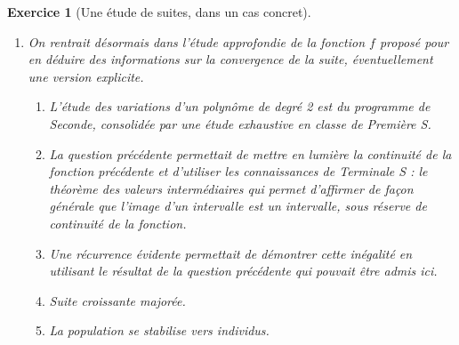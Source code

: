 \documentclass[12pt,a4paper]{article}
\newcommand{\np}{\numprint}
\theoremstyle{break}
\theoremstyle{nobreak}
\newtheorem{exercice}{Exercice}
\theoremstyle{nonumberplain}
\begin{document}
\begin{exercice}[Une étude de suites, dans un cas concret]
\begin{enumerate}
\begin{enumerate}
             Il suffisait d'effectuer un calcul ou de mettre en œuvre
             rapidement l'algorithme sur la calculatrice.
           \item On cherchait juste à établir une conjecture sensée à
             partir du tableau de valeurs précédent. Quelques élèves ont
             fournit des résultats étranges.
         \end{enumerate}
       \item On rentrait désormais dans l'étude approfondie de la
         fonction $f$ proposé pour en déduire des informations sur la
         convergence de la suite, éventuellement une version explicite.
         \begin{enumerate}
           \item L'étude des variations d'un polynôme de degré 2 est du
             programme de Seconde, consolidée par une étude exhaustive
             en classe de Première S.
           \item La question précédente permettait de mettre en lumière
             la continuité de la fonction précédente et d'utiliser les
             connaissances de Terminale S : le théorème des valeurs
             intermédiaires qui permet d'affirmer de façon générale que
             l'image d'un intervalle est un intervalle, sous réserve de
             continuité de la fonction.
           \item Une récurrence évidente permettait de démontrer cette
             inégalité en utilisant le résultat de la question
             précédente qui pouvait être admis ici.
           \item Suite croissante majorée.
           \item La population se stabilise vers \np{473000} individus.
         \end{enumerate}
  \end{enumerate}
\end{exercice}
\end{document}
